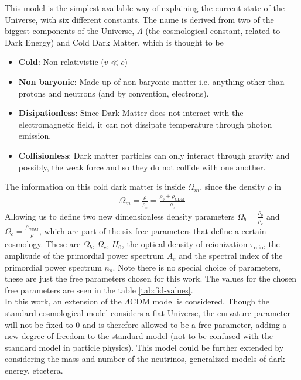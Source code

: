 This model is the simplest available way of explaining the current state of the Universe, with six different constants. The name is derived from two of the biggest components of the Universe, $\Lambda$ (the cosmological constant, related to Dark Energy) and Cold Dark Matter, which is thought to be
\begin{itemize}
	\item \textbf{Cold}: Non relativistic ($v \ll c$)
	\item \textbf{Non baryonic}: Made up of non baryonic matter i.e. anything other than protons and neutrons (and by convention, electrons).
	\item \textbf{Disipationless}: Since Dark Matter does not interact with the electromagnetic field, it can not dissipate temperature through photon emission.
	\item \textbf{Collisionless}: Dark matter particles can only interact through gravity and possibly, the weak force and so they do not collide with one another.
\end{itemize}
The information on this cold dark matter is inside $\Omega_m$, since the density $\rho$ in
\begin{align}
	\Omega_m = \frac{\rho}{\rho_c} = \frac{\rho_b + \rho_{\text{CDM}}}{\rho_c}
\end{align}
Allowing us to define two new dimensionless density parameters $\Omega_b = \frac{\rho_b}{\rho_c}$ and $\Omega_c =  \frac{\rho_\text{CDM}}{\rho}$, which are part of the six free parameters that define a certain cosmology. These are $\Omega_b$, $\Omega_c$, $H_0$, the optical density of reionization $\tau_{\text{reio}}$, the amplitude of the primordial power spectrum $A_s$ and the spectral index of the primordial power spectrum $n_s$. Note there is no special choice of parameters, these are just the free parameters chosen for this work. The values for the chosen free parameters are seen in the table \ref{tab:fid-values}.\\

In this work, an extension of the $\Lambda$CDM model is considered. Though the standard cosmological model considers a flat Universe, the curvature parameter will not be fixed to $0$ and is therefore allowed to be a free parameter, adding a new degree of freedom to the standard model (not to be confused with the standard model in particle physics). This model could be further extended by considering the mass and number of the neutrinos, generalized models of dark energy, etcetera.\\

